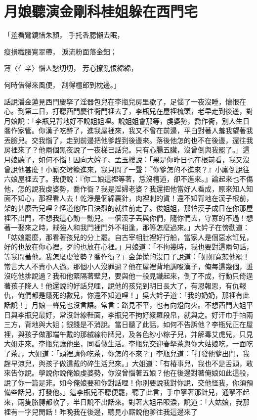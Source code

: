 %

\chapter{月娘聽演金剛科\KG 桂姐躲在西門宅}

「羞看鸞鏡惜朱顏，  手托香腮懶去眠，

瘦損纖腰寬翠帶，  淚流粉面落金鈿；

薄〈亻辛〉惱人愁切切，  芳心撩亂恨綿綿，

何時借得來風便，  刮得檀郎到枕邊。」

話說潘金蓮見西門慶拏了淫器包兒在李瓶兒房里歇了，足惱了一夜沒睡，懷恨在心。到第二日，打聽西門慶往衙門裡去了，李瓶兒在屋裡梳頭，老早走到後邊，對月娘說：「李瓶兒背地好不說姐姐哩。說姐姐會那等，虔婆勢，喬作衙，別人生日喬作家管。你漢子吃醉了，進我屋裡來，我又不曾在前邊，平白對著人羞我望著我丟臉兒。交我惱了，走到前邊把他爹趕到後邊來。落後他怎的也不在後邊，還往我房裡來了？他兩個黑夜說了一夜梯已話兒。只有心腸五臟，沒曾倒與我罷了。」這月娘聽了，如何不惱！因向大妗子、孟玉樓說：「果是你昨日也在根前看，我又沒曾說他甚麼！小廝交燈籠進來，我只問了一聲：『你爹怎的不進來？』小廝倒說往六娘屋裡去了。我便說：『你二娘這裡等著，恁沒槽道，卻不進來。』論起來也不傷他，怎的說我虔婆勢，喬作衙？我是淫婦老婆？我還把他當好人看成，原來知人知面不知心，那裡看人去！乾淨是個綿裏針，肉裡刺的貨！還不知背地在漢子根前，架的甚麼舌兒哩？怪道他昨日決烈的就往前走了。俊姐姐，那怕漢子成日在你那屋裡不出門，不想我這心動一動兒。一個漢子丟與你們，隨你們去，守寡的不過！想著一娶來之時，賊強人和我門裡門外不相逢，那等怎麼過來。」大妗子在傍勸道：「姑娘罷麼，那看著孩兒的分上罷。自古宰相肚裡好行船，當家人是個惡水缸兒，好的也放在你心裡，歹的也放在心裡。」月娘道：「不拘幾時，我也要對這兩句話，等我問著他。我怎麼虔婆勢？喬作衙？」金蓮慌的沒口子說道：「姐姐寬恕他罷！常言大人不責小人過。那個小人沒罪過？他在屋裡背地調唆漢子，俺每這幾個，誰沒吃他排說過？我和他緊隔著壁兒，要與他一般見識起來，倒了不成，行動只倚逞著孩子降人！他還說的好話兒哩，說他的孩兒到明日長大了，有恩報恩，有仇報仇，俺們都是餓死的數兒，你還不知道哩！」吳大妗子道：「我的奶奶，那裡有此話說！」月娘一聲兒也沒言語。常言：路見不平，也有向燈向火。不想西門大姐平日與李瓶兒最好，常沒針線鞋面，李瓶兒不拘好綾羅段帛，就與之。好汗巾手帕兩三方，背地與大姐；銀錢是不消說。當日聽了此話，如何不告訴他？李瓶兒正在屋裡，與孩子做那端午戴的那絨線符牌兒，及各色紗小粽子兒，并解毒艾虎兒，只見大姐走來。李瓶兒讓他坐，同看做生活。李瓶兒交迎春拏茶與你大姑娘吃，一面吃了茶。，大姐道：「頭裡請你吃茶，你怎的不來？」李瓶兒道：「打發他爹出門，我趕早涼兒，與孩子做這戴的碎生活兒來。」大姐道：「有樁事兒，我也不是舌頭，敢來告你說。學說你說俺娘虔婆勢，你沒曾惱著五娘？他在後邊對著俺娘如此這般，說了你一篇是非。如今俺娘要和你對話哩！你別要說我對你說，交他怪我，你須預備些話兒，打發他。」這李瓶兒不聽便罷，聽了此言，手中拏著那針兒，通拏不起來，兩隻胳膊都軟了，半日說不出話來。對著大姐吊眼淚，說道：「大姑娘，我那裡有一字兒閒話！昨晚我在後邊，聽見小廝說他爹往我這邊來了